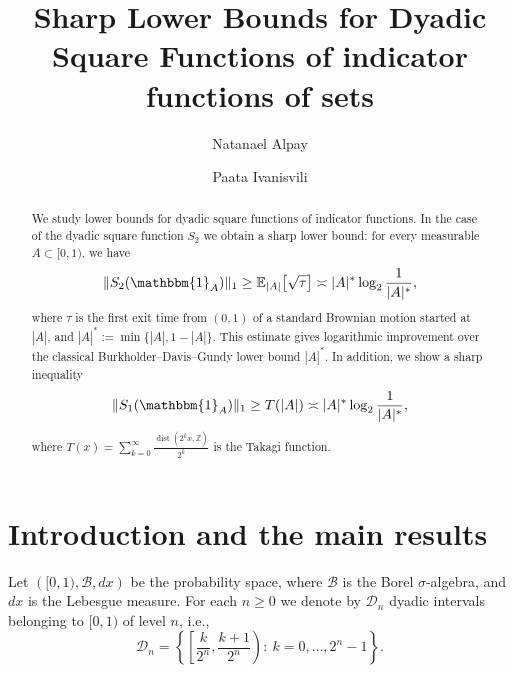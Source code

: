 \documentclass[11pt]{amsart}
\title[Bounds for Dyadic Square Functions of indicator functions]{{Sharp} Lower Bounds for Dyadic Square Functions of indicator functions of sets}
\date{}
\author[N. Alpay]{Natanael Alpay}
\author[P. Ivanisvili]{Paata Ivanisvili}
\theoremstyle{definition}
\renewcommand{\1}{{\mathbbm{1}}}
\begin{document}
\begin{abstract}
We study lower bounds for dyadic square functions of indicator functions. In the case of the dyadic square function $S_{2}$ we obtain a sharp lower bound: for every measurable $A \subset {[0,1)}$, we have
\[
\|S_{2}(\mathbbm{1}_{A})\|_{1}\ge \mathbb{E}_{|A|}\big[\sqrt{\tau}\big]\asymp |A|^{*}\log_2\frac{1}{|A|^{*}},
\]
where $\tau$ is the first exit time from $(0,1)$ of a standard Brownian motion started at $|A|$, and $|A|^{*}:=\min\{|A|,1-|A|\}$.  
This estimate gives logarithmic improvement over the classical Burkholder--Davis--Gundy lower bound $|A|^{*}$. 
In addition, we show a sharp inequality
\[
\|S_{1}(\mathbbm{1}_{A})\|_{1} \ge T(|A|)\asymp  |A|^{*}\log_{2}\frac{1}{|A|^{*}},
\]
where $T(x)=\sum_{k=0}^{\infty}\frac{\operatorname{dist}(2^{k}x,\mathbb{Z})}{2^{k}}$ is the Takagi function. 
\end{abstract}


\maketitle


\section{Introduction and the main  results}

Let  $({[0,1)}, \mathcal{B}, dx)$ be the probability space, where $\mathcal{B}$ is the Borel $\sigma$-algebra, and $dx$ is the Lebesgue measure. For each $n \geq 0$ we denote by $\mathcal{D}_n$ dyadic intervals belonging to {$[0,1)$} of level $n$, i.e.,
\[
\mathcal{D}_n=
{\left\{
\left[\frac{k}{2^n}, \frac{k+1}{2^n}\right)
:\ k=0,\ldots,2^n-1
\right\}.}
\]
\end{document}

